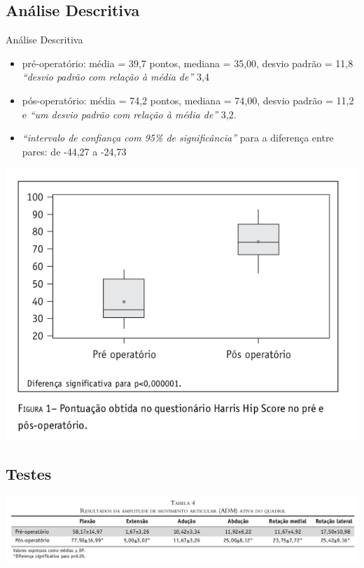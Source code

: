 \documentclass{beamer}
\begin{document}
\subsection{Análise Descritiva}

\begin{frame}{Análise Descritiva}
  \begin{itemize}
  \item pré-operatório: média = 39,7 pontos, mediana = 35,00, desvio
padrão = 11,8  {\em ``desvio padrão com relação à média de''} 3,4
\item pós-operatório: média = 74,2 pontos, mediana = 74,00, desvio padrão = 11,2
e {\em ``um desvio padrão com relação à média de''} 3,2.
\item {\em ``intervalo de confiança com 95\% de significância''} para a diferença entre pares: de -44,27 a -24,73
  \end{itemize}
\end{frame}

\begin{frame}{}
  \begin{center}
    \includegraphics[height=.9\textheight]{figuras/figura1}
  \end{center}
\end{frame}

\subsection{Testes}

\begin{frame}{}
  \begin{center}
    \includegraphics[width=1.15\textwidth]{figuras/tabela4}
  \end{center}
\end{frame}
\end{document}
